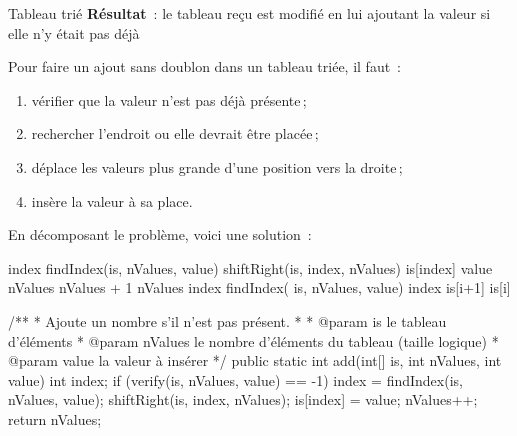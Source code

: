 \begin{Fiche}{Tableau trié}
	\textbf{Résultat}~: le tableau reçu est modifié en lui ajoutant la valeur si
	elle n'y était pas déjà


	Pour faire un ajout sans doublon dans un tableau triée, il faut~:

	\begin{enumerate}
		\item vérifier que la valeur n'est pas déjà présente\,;
		\item rechercher l'endroit ou elle devrait être placée\,;
		\item déplace les valeurs plus grande d'une position vers la droite\,;
		\item insère la valeur à sa place. 
	\end{enumerate}

	En décomposant le problème, voici une solution~:

	\begin{pseudocode}
				\Stmt index \Gets findIndex(is, nValues, value)
				\Stmt shiftRight(is, index, nValues)
				\Let is[index] \Gets value
				\Let nValues \Gets nValues + 1
			\EndIf
			\Return nValues
		\EndAlgo
			\Stmt index \Gets findIndex( is, nValues, value)
				\Return index
			\Else
			\EndIf
		\EndAlgo
		\Empty
				\Let is[i+1] \Gets is[i]
			\EndFor
		\EndAlgo
	\end{pseudocode}

	\begin{java}
/**
 * Ajoute un nombre s'il n'est pas présent.
 * 
 * @param is le tableau d'éléments
 * @param nValues le nombre d'éléments du tableau (taille logique)
 * @param value la valeur à insérer
 */
public static int add(int[] is, int nValues, int value){
	int index;
	if (verify(is, nValues, value) == -1){
		index = findIndex(is, nValues, value);
		shiftRight(is, index, nValues);
		is[index] = value;
		nValues++;
	}
	return nValues;
}


\end{java}
\end{Fiche}
